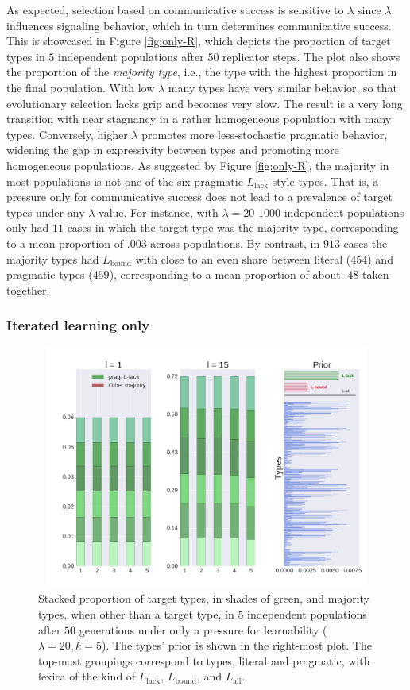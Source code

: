 \documentclass[a4paper, 11pt]{article}
\theoremstyle{Satz}
\newcommand{\mylang}[1]{\ensuremath{L_{\text{#1}}}\xspace} %
\newcommand{\Lall}{\mylang{all}}
\newcommand{\Lbound}{\mylang{bound}}
\newcommand{\Llack}{\mylang{lack}}
\begin{document}
As expected, selection based on communicative success is sensitive to $\lambda$ since $\lambda$
influences signaling behavior, which in turn determines communicative success. This is
showcased in Figure \ref{fig:only-R}, which depicts the proportion of target types in $5$
independent populations after $50$ replicator steps. The plot also shows the proportion of the
\emph{majority type}, i.e., the type with the highest proportion in the final population. With
low $\lambda$ many types have very similar behavior, so that evolutionary selection lacks grip
and becomes very slow. The result is a very long transition with near stagnancy in a rather
homogeneous population with many types. Conversely, higher $\lambda$ promotes more
less-stochastic pragmatic behavior, widening the gap in expressivity between types and
promoting more homogeneous populations. As suggested by Figure \ref{fig:only-R}, the majority
in most populations is not one of the six pragmatic $\Llack$-style types. That is, a pressure
only for communicative success does not lead to a prevalence of target types under any
$\lambda$-value. For instance, with $\lambda = 20$ $1000$ independent populations only had $11$
cases in which the target type was the majority type, corresponding to a mean proportion of
$.003$ across populations. By contrast, in $913$ cases the majority types had $\Lbound$ with
close to an even share between literal ($454$) and pragmatic types ($459$), corresponding to a
mean proportion of about $.48$ taken together.


\subsubsection{Iterated learning only}

\begin{figure}[t]
\centering
\includegraphics[width=1\textwidth,height=8cm,keepaspectratio]{./plots/fig2-onlym-pr}
\caption{Stacked proportion of target types, in shades of green, and majority types, when other
  than a target type, in $5$ independent populations after $50$ generations under only a
  pressure for learnability ($\lambda = 20, k = 5$). The types' prior is shown in the
  right-most plot. The top-most groupings correspond to types, literal and pragmatic, with
  lexica of the kind of $\Llack$, $\Lbound$, and $\Lall$.}
\label{fig:only-M}
\end{figure}
\end{document}

